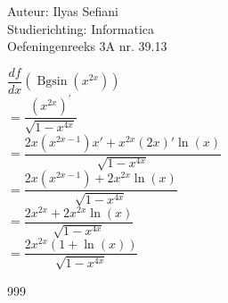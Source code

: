 \documentclass[a4paper]{article}
\begin{document}
\noindent \large Auteur: Ilyas Sefiani \\
\noindent \large Studierichting: Informatica\\
\noindent \large Oefeningenreeks 3A nr. 39.13\\

\medskip

\normalsize

$\dfrac{df}{dx}(\operatorname{Bgsin}{(x^{2x})})$\\

$=\dfrac{(x^{2x})^{'}}{\sqrt{1-x^{4x}}}$\\

$=\dfrac{2x(x^{2x-1})x'+x^{2x}(2x)'\ln(x)}{\sqrt{1-x^{4x}}}$\\

$=\dfrac{2x(x^{2x-1})+2x^{2x}\ln(x)}{\sqrt{1-x^{4x}}}$\\

$=\dfrac{2x^{2x}+2x^{2x}\ln(x)}{\sqrt{1-x^{4x}}}$\\

$=\dfrac{2x^{2x}(1+\ln(x))}{\sqrt{1-x^{4x}}}$\\

\begin{thebibliography}{999}
\end{thebibliography}
\end{document}
